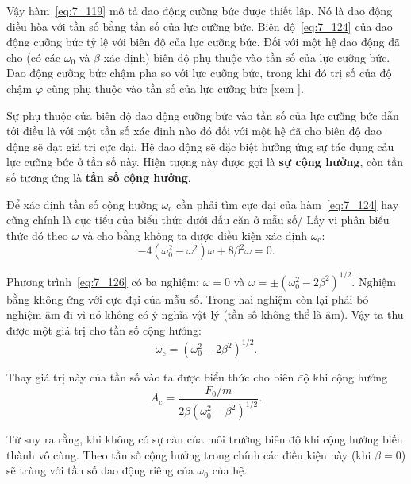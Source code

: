 Vậy hàm~\eqref{eq:7_119} mô tả dao động cưỡng bức được thiết lập. Nó là dao động điều hòa với tần số bằng tần số của lực cưỡng bức. Biên độ~\eqref{eq:7_124} của dao động cưỡng bức tỷ lệ với biên độ của lực cưỡng bức. Đối với một hệ dao động đã cho (có các $\omega_0$ và $\beta$ xác định) biên độ phụ thuộc vào tần số của lực cưỡng bức. Dao động cưỡng bức chậm pha so với lực cưỡng bức, trong khi đó trị số của độ chậm $\varphi$ cũng phụ thuộc vào tần số của lực cưỡng bức [xem ].

Sự phụ thuộc của biên độ dao động cưỡng bức vào tần số của lực cưỡng bức dẫn tới điều là với một tần số xác định nào đó đối với một hệ đã cho biên độ dao động sẽ đạt giá trị cực đại. Hệ dao động sẽ đặc biệt hưởng ứng sự tác dụng cảu lực cưỡng bức ở tần số này. Hiện tượng này được gọi là \textbf{sự cộng hưởng}, còn tần số tương ứng là \textbf{tần số cộng hưởng}.

Để xác định tần số cộng hưởng $\omega_{\text{c}}$ cần phải tìm cực đại của hàm~\eqref{eq:7_124} hay cũng chính là cực tiểu của biểu thức dưới dấu căn ở mẫu số/ Lấy vi phân biểu thức đó theo $\omega$ và cho bằng không ta được điều kiện xác định $\omega_{\text{c}}$:
\begin{equation}\label{eq:7_126}
	-4\left(\omega_0^2 - \omega^2\right)\omega + 8\beta^2\omega = 0.
\end{equation}

Phương trình~\eqref{eq:7_126} có ba nghiệm: $\omega=0$ và
$\omega=\pm\left(\omega_0^2-2\beta^2\right)^{1/2}$. Nghiệm bằng không ứng với cực đại của mẫu số. Trong hai nghiệm còn lại phải bỏ nghiệm âm đi vì nó không có ý nghĩa vật lý (tần số không thể là âm). Vậy ta thu được một giá trị cho tần số cộng hưởng:
\begin{equation}\label{eq:7_127}
	\omega_{\text{c}} = \left(\omega_0^2-2\beta^2\right)^{1/2}.
\end{equation}

\noindent
Thay giá trị này của tần số vào  ta được biểu thức cho biên độ khi cộng hưởng
\begin{equation}\label{eq:7_128}
	A_{\text{c}} = \frac{F_0/m}{2\beta \left( \omega_0^2 - \beta^2\right)^{1/2}}.
\end{equation}

\noindent
Từ  suy ra rằng, khi không có sự cản của môi trường biên độ khi cộng hưởng biến thành vô cùng. Theo  tần số cộng hưởng trong chính các điều kiện này (khi $\beta=0$) sẽ trùng với tần số dao động riêng của $\omega_0$ của hệ.

